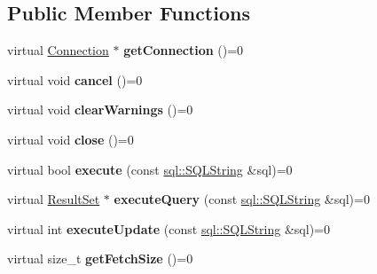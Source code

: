 \subsection*{Public Member Functions}
\begin{DoxyCompactItemize}
\item 
\hypertarget{classsql_1_1_statement_a2c3085011600e4208f94ec8d2f7707c3}{}\label{classsql_1_1_statement_a2c3085011600e4208f94ec8d2f7707c3} 
virtual \hyperlink{classsql_1_1_connection}{Connection} $\ast$ {\bfseries get\+Connection} ()=0
\item 
\hypertarget{classsql_1_1_statement_afb9b8908e2d2a7f30c760e307feeb857}{}\label{classsql_1_1_statement_afb9b8908e2d2a7f30c760e307feeb857} 
virtual void {\bfseries cancel} ()=0
\item 
\hypertarget{classsql_1_1_statement_a254f97d835d62d9a2e7400409e48ea34}{}\label{classsql_1_1_statement_a254f97d835d62d9a2e7400409e48ea34} 
virtual void {\bfseries clear\+Warnings} ()=0
\item 
\hypertarget{classsql_1_1_statement_ae781a85fe88efb3cf35cd5e0310bb4ed}{}\label{classsql_1_1_statement_ae781a85fe88efb3cf35cd5e0310bb4ed} 
virtual void {\bfseries close} ()=0
\item 
\hypertarget{classsql_1_1_statement_aa5a54d7d71c8d622d8acf578cbbe6f16}{}\label{classsql_1_1_statement_aa5a54d7d71c8d622d8acf578cbbe6f16} 
virtual bool {\bfseries execute} (const \hyperlink{classsql_1_1_s_q_l_string}{sql\+::\+S\+Q\+L\+String} \&sql)=0
\item 
\hypertarget{classsql_1_1_statement_ae3afe5ea2a8bf0cc7d5eac917da7bd19}{}\label{classsql_1_1_statement_ae3afe5ea2a8bf0cc7d5eac917da7bd19} 
virtual \hyperlink{classsql_1_1_result_set}{Result\+Set} $\ast$ {\bfseries execute\+Query} (const \hyperlink{classsql_1_1_s_q_l_string}{sql\+::\+S\+Q\+L\+String} \&sql)=0
\item 
\hypertarget{classsql_1_1_statement_a178c0510e1ea9e906e1bfd6638c7f6ca}{}\label{classsql_1_1_statement_a178c0510e1ea9e906e1bfd6638c7f6ca} 
virtual int {\bfseries execute\+Update} (const \hyperlink{classsql_1_1_s_q_l_string}{sql\+::\+S\+Q\+L\+String} \&sql)=0
\item 
\hypertarget{classsql_1_1_statement_a20a95dacaaf567d49e70af4522a7b64b}{}\label{classsql_1_1_statement_a20a95dacaaf567d49e70af4522a7b64b} 
virtual size\+\_\+t {\bfseries get\+Fetch\+Size} ()=0
\item 
\hypertarget{classsql_1_1_statement_a0f823e05b313b634b0cd0861f3b1d416}{}\label{classsql_1_1_statement_a0f823e05b313b634b0cd0861f3b1d416} 

\end{DoxyCompactItemize}
